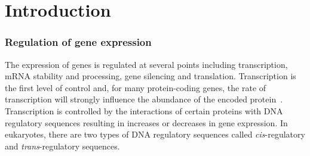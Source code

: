 \documentclass[../main.tex]{subfiles}
\begin{document}
\chapter{Introduction}
\label{chapter1}
\subsection{Regulation of gene expression}\label{chapter1:regulation-of-gene-expression}
The expression of genes is regulated at several points including transcription, mRNA stability and processing, gene silencing and translation. Transcription is the first level of control and, for many protein\hyp{}coding genes, the rate of transcription will strongly influence
the abundance of the encoded protein~\autocite{liuDependencyCellularProtein2016}. Transcription is controlled by the interactions of certain proteins with DNA regulatory sequences resulting in increases or decreases in gene expression. In eukaryotes, there are two types of DNA regulatory sequences called \textit{cis}\hyp{}regulatory and \textit{trans}\hyp{}regulatory sequences.
\end{document}
